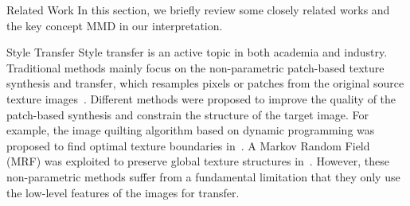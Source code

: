 \begin{section}{Related Work}
In this section, we briefly review some closely related works and the key concept MMD in our interpretation.
\begin{paragraph}{Style Transfer}
Style transfer is an active topic in both academia and industry. Traditional methods mainly focus on the non-parametric patch-based texture synthesis and transfer, which resamples pixels or patches from the original source texture images~\cite{hertzmann2001image,efros2001image,efros1999texture,liang2001real}. Different methods were proposed to improve the quality of the patch-based synthesis and constrain the structure of the target image. For example, the image quilting algorithm based on dynamic programming was proposed to find optimal texture boundaries in~\cite{efros2001image}. A Markov Random Field (MRF) was exploited to preserve global texture structures in~\cite{frigo2016split}. However, these non-parametric methods suffer from a fundamental limitation that they only use the low-level features of the images for transfer. 


\end{paragraph}
\end{section}
